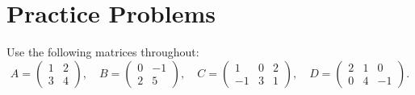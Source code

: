 \section{Practice Problems}

Use the following matrices throughout:
\[
A = \begin{pmatrix} 1 & 2 \\ 3 & 4 \end{pmatrix}, \quad
B = \begin{pmatrix} 0 & -1 \\ 2 & 5 \end{pmatrix}, \quad
C = \begin{pmatrix} 1 & 0 & 2 \\ -1 & 3 & 1 \end{pmatrix}, \quad
D = \begin{pmatrix} 2 & 1 & 0 \\ 0 & 4 & -1 \end{pmatrix}.
\]

